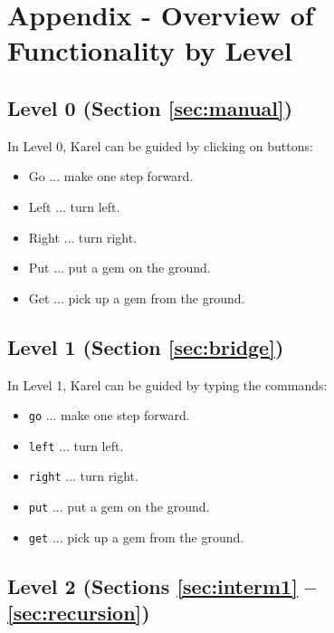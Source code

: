 {{{{\section{Appendix - Overview of Functionality by Level}\label{sec:newfunc3}

\subsection{Level 0 (Section \ref{sec:manual})}

In Level 0, Karel can be guided by clicking on buttons:
\begin{itemize}
\item Go ... make one step forward.
\item Left ... turn left.
\item Right ... turn right.
\item Put ... put a gem on the ground.
\item Get ... pick up a gem from the ground.
\end{itemize}

\subsection{Level 1 (Section \ref{sec:bridge})}

In Level 1, Karel can be guided by typing the commands:
\begin{itemize}
\item {\tt go} ... make one step forward.
\item {\tt left} ... turn left.
\item {\tt right} ... turn right.
\item {\tt put} ... put a gem on the ground.
\item {\tt get} ... pick up a gem from the ground.
\end{itemize}

\subsection{Level 2 (Sections \ref{sec:interm1} -- \ref{sec:recursion})}

}}}}
